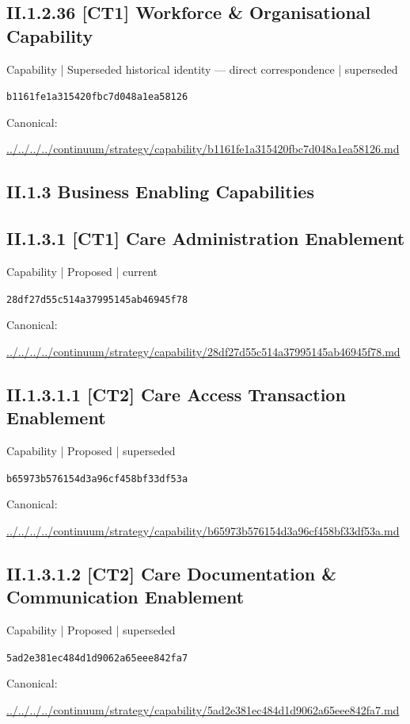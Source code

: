\documentclass[10pt,a4paper]{article}
\begin{document}
\subsection*{II.1.2.36 [CT1] Workforce \& Organisational Capability}
{\small Capability | Superseded historical identity — direct correspondence | superseded}\par
\texttt{b1161fe1a315420fbc7d048a1ea58126}\par
Canonical: \par
{\footnotesize\url{../../../../continuum/strategy/capability/b1161fe1a315420fbc7d048a1ea58126.md}}\par
\subsection*{II.1.3 Business Enabling Capabilities}
\subsection*{II.1.3.1 [CT1] Care Administration Enablement}
{\small Capability | Proposed | current}\par
\texttt{28df27d55c514a37995145ab46945f78}\par
Canonical: \par
{\footnotesize\url{../../../../continuum/strategy/capability/28df27d55c514a37995145ab46945f78.md}}\par
\subsection*{II.1.3.1.1 [CT2] Care Access Transaction Enablement}
{\small Capability | Proposed | superseded}\par
\texttt{b65973b576154d3a96cf458bf33df53a}\par
Canonical: \par
{\footnotesize\url{../../../../continuum/strategy/capability/b65973b576154d3a96cf458bf33df53a.md}}\par
\subsection*{II.1.3.1.2 [CT2] Care Documentation \& Communication Enablement}
{\small Capability | Proposed | superseded}\par
\texttt{5ad2e381ec484d1d9062a65eee842fa7}\par
Canonical: \par
{\footnotesize\url{../../../../continuum/strategy/capability/5ad2e381ec484d1d9062a65eee842fa7.md}}\par
\end{document}
